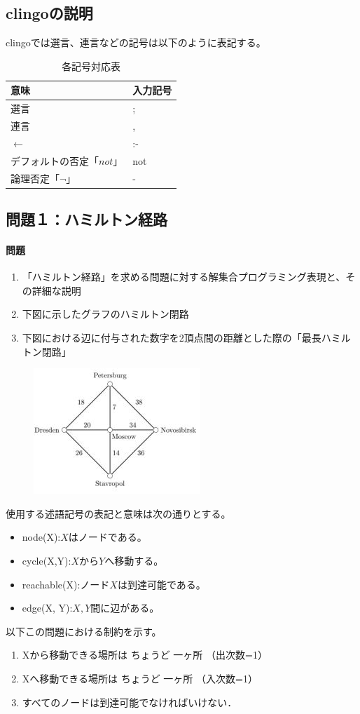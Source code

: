 \documentclass[dvipdfmx]{jsarticle}
\begin{document}
\subsection{clingoの説明}
clingoでは選言、連言などの記号は以下のように表記する。
\begin{table}[H]
  \centering
  \begin{tabular}{|l|l|} \hline
    意味 & 入力記号 \\ \hline
    選言              & ;   \\ \hline
    連言              & ,   \\ \hline
    $\leftarrow$    & :-  \\ \hline
    デフォルトの否定「$not$」 & not \\ \hline
    論理否定「$\neg$」    & - \\ \hline
    \end{tabular}
    \caption{各記号対応表}
\end{table}
\subsection{問題１：ハミルトン経路}
\paragraph{問題}
\begin{enumerate}
  \item 「ハミルトン経路」を求める問題に対する解集合プログラミング表現と、その詳細な説明
  \item 下図に示したグラフのハミルトン閉路
  \item 下図における辺に付与された数字を2頂点間の距離とした際の「最長ハミルトン閉路」
\end{enumerate}
\begin{figure}[H]
  \centering
  \includegraphics[scale=1.2]{images/hamiruton.JPG}
\end{figure}
使用する述語記号の表記と意味は次の通りとする。
\begin{itemize}
  \item node(X):$X$はノードである。
  \item cycle(X,Y):$XからYへ移動する。$
  \item reachable(X):ノード$X$は到達可能である。
  \item edge(X, Y):$X,Y$間に辺がある。
\end{itemize}
以下この問題における制約を示す。
\begin{enumerate}
  \item Xから移動できる場所は ちょうど 一ヶ所 （出次数=1）
  \item Xへ移動できる場所は ちょうど 一ヶ所 （入次数=1）
  \item すべてのノードは到達可能でなければいけない．
\end{enumerate}
\end{document}
